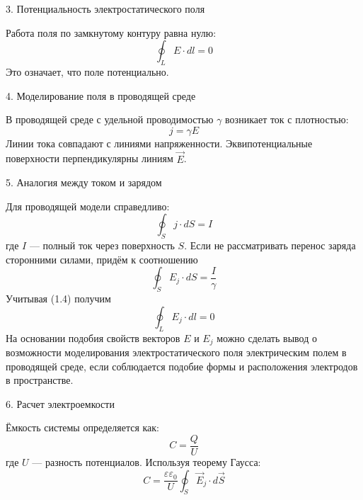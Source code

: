 \documentclass[14pt,a4paper]{extarticle}
\begin{document}
3. Потенциальность электростатического поля

Работа поля по замкнутому контуру равна нулю:
$$
\oint_L E \cdot dl = 0
$$  
Это означает, что поле потенциально.

4. Моделирование поля в проводящей среде  

В проводящей среде с удельной проводимостью $\gamma$ возникает ток с плотностью:  
$$
j = \gamma E
$$  
Линии тока совпадают с линиями напряженности. Эквипотенциальные поверхности перпендикулярны линиям $\vec{E}$.

5. Аналогия между током и зарядом  

Для проводящей модели справедливо:  
$$
\oint_S j \cdot dS = I
$$  
где $I$ — полный ток через поверхность $S$. Если не рассматривать
перенос заряда сторонними силами, придём к соотношению 
$$
\oint_S E_j \cdot dS = \frac{I}{\gamma}
$$
Учитывая (1.4) получим
$$
\oint_L E_{j} \cdot dl = 0
$$
На основании подобия свойств векторов $E$ и $E_j$
можно сделать вывод о возможности моделирования электростатического
поля электрическим полем в проводящей среде, если соблюдается
подобие формы и расположения электродов в пространстве. 


6. Расчет электроемкости

Ёмкость системы определяется как:
$$
C = \frac{Q}{U}
$$
где $U$ — разность потенциалов. Используя теорему Гаусса:  
$$
C = \frac{\varepsilon \varepsilon_0 }{U} \oint_S \vec{E}_j \cdot d\vec{S}
$$
\end{document}
